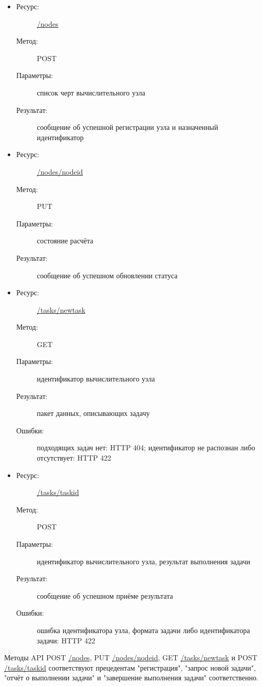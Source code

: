 \documentclass[a4paper,12pt]{report}
\numberwithin{equation}{section}
\begin{document}
\begin{itemize}
  \item
  \begin{description}
    \item[Ресурс:] \url{/nodes}
    \item[Метод:] POST
    \item[Параметры:] список черт вычислительного узла
    \item[Результат:] сообщение об успешной регистрации узла и назначенный идентификатор
  \end{description}
  \item
  \begin{description}
    \item[Ресурс:] \url{/nodes/nodeid}
    \item[Метод:] PUT
    \item[Параметры:] состояние расчёта
    \item[Результат:] сообщение об успешном обновлении статуса
  \end{description}
  \item
  \begin{description}
    \item[Ресурс:] \url{/tasks/newtask}
    \item[Метод:] GET
    \item[Параметры:] идентификатор вычислительного узла
    \item[Результат:] пакет данных, описывающих задачу
    \item[Ошибки:] подходящих задач нет: HTTP 404; идентификатор не распознан либо отсутствует: HTTP 422
  \end{description}
  \item
  \begin{description}
    \item[Ресурс:] \url{/tasks/taskid}
    \item[Метод:] POST
    \item[Параметры:] идентификатор вычислительного узла, результат выполнения задачи
    \item[Результат:] сообщение об успешном приёме результата
    \item[Ошибки:] ошибка идентификатора узла, формата задачи либо идентификатора задачи: HTTP 422
  \end{description}
\end{itemize}

Методы API POST \url{/nodes}, PUT \url{/nodes/nodeid}, GET \url{/tasks/newtask} и POST \url{/tasks/taskid} соответствуют прецедентам "регистрация", "запрос новой задачи", "отчёт о выполнении задачи" и "завершение выполнения задачи" соответственно.
\end{document}
